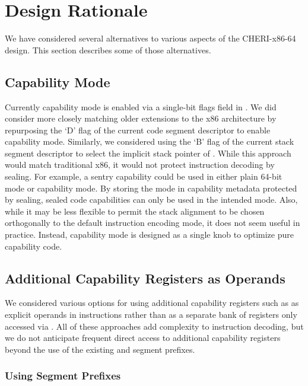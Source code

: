 \section{Design Rationale}

We have considered several alternatives to various aspects of the
CHERI-x86-64 design.  This section describes some of those
alternatives.

\subsection{Capability Mode}

Currently capability mode is enabled via a single-bit flags field in
\CIP{}.  We did consider more closely matching older extensions to the
x86 architecture by repurposing the `D' flag of the current code
segment descriptor to enable capability mode.  Similarly, we
considered using the `B' flag of the current stack segment descriptor
to select the implicit stack pointer of \CSP{}.  While this approach
would match traditional x86, it would not protect instruction decoding
by sealing.  For example, a sentry capability could be used in either
plain 64-bit mode or capability mode.  By storing the mode in
capability metadata protected by sealing, sealed code capabilities can
only be used in the intended mode.  Also, while it may be less
flexible to permit the stack alignment to be chosen orthogonally to the
default instruction encoding mode, it does not seem useful in
practice.  Instead, capability mode is designed as a single knob to
optimize pure capability code.

\subsection{Additional Capability Registers as Operands}

We considered various options for using additional capability
registers such as \CGS{} as explicit operands in instructions rather
than as a separate bank of registers only accessed via
.  All of these approaches add complexity to
instruction decoding, but we do not anticipate frequent direct access
to additional capability registers beyond the use of the existing
\FS{} and \GS{} segment prefixes.

\subsubsection{Using Segment Prefixes}

